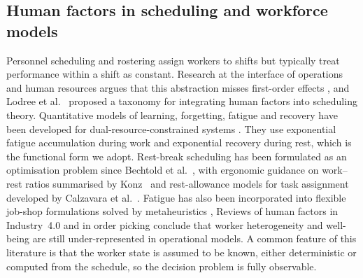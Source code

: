 \subsection{Human factors in scheduling and workforce models}
Personnel scheduling and rostering \cite{ernst2004,burke2004,vandenbergh2013} assign workers to shifts but typically treat performance within a shift as constant. Research at the interface of operations and human resources argues that this abstraction misses first-order effects \cite{boudreau2003,neumann2010}, and Lodree et al.~\cite{lodree2009} proposed a taxonomy for integrating human factors into scheduling theory. Quantitative models of learning, forgetting, fatigue and recovery have been developed for dual-resource-constrained systems \cite{wright1936,jaber2010,jaber2013,givi2015}. They use exponential fatigue accumulation during work and exponential recovery during rest, which is the functional form we adopt. Rest-break scheduling has been formulated as an optimisation problem since Bechtold et al.~\cite{bechtold1984}, with ergonomic guidance on work--rest ratios summarised by Konz~\cite{konz1998} and rest-allowance models for task assignment developed by Calzavara et al.~\cite{calzavara2019}. Fatigue has also been incorporated into flexible job-shop formulations solved by metaheuristics \cite{tan2021},  Reviews of human factors in Industry~4.0 and in order picking \cite{grosse2017,kadir2019,neumann2021,katiraee2021} conclude that worker heterogeneity and well-being are still under-represented in operational models. A common feature of this literature is that the worker state is assumed to be known, either deterministic or computed from the schedule, so the decision problem is fully observable.

